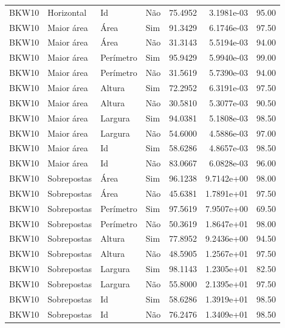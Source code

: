 \begin{tabular}{llllrrr}
BKW10     & Horizontal  & Id        & Não         & 75.4952      & 3.1981e-03 & 95.00    \\
BKW10     & Maior área  & Área      & Sim         & 91.3429      & 6.1746e-03 & 97.50    \\
BKW10     & Maior área  & Área      & Não         & 31.3143      & 5.5194e-03 & 94.00    \\
BKW10     & Maior área  & Perímetro & Sim         & 95.9429      & 5.9940e-03 & 99.00    \\
BKW10     & Maior área  & Perímetro & Não         & 31.5619      & 5.7390e-03 & 94.00    \\
BKW10     & Maior área  & Altura    & Sim         & 72.2952      & 6.3191e-03 & 97.50    \\
BKW10     & Maior área  & Altura    & Não         & 30.5810      & 5.3077e-03 & 90.50    \\
BKW10     & Maior área  & Largura   & Sim         & 94.0381      & 5.1808e-03 & 98.50    \\
BKW10     & Maior área  & Largura   & Não         & 54.6000      & 4.5886e-03 & 97.00    \\
BKW10     & Maior área  & Id        & Sim         & 58.6286      & 4.8657e-03 & 98.50    \\
BKW10     & Maior área  & Id        & Não         & 83.0667      & 6.0828e-03 & 96.00    \\
BKW10     & Sobrepostas & Área      & Sim         & 96.1238      & 9.7142e+00 & 98.00    \\
BKW10     & Sobrepostas & Área      & Não         & 45.6381      & 1.7891e+01 & 97.50    \\
BKW10     & Sobrepostas & Perímetro & Sim         & 97.5619      & 7.9507e+00 & 69.50    \\
BKW10     & Sobrepostas & Perímetro & Não         & 50.3619      & 1.8647e+01 & 98.00    \\
BKW10     & Sobrepostas & Altura    & Sim         & 77.8952      & 9.2436e+00 & 94.50    \\
BKW10     & Sobrepostas & Altura    & Não         & 48.5905      & 1.2567e+01 & 97.50    \\
BKW10     & Sobrepostas & Largura   & Sim         & 98.1143      & 1.2305e+01 & 82.50    \\
BKW10     & Sobrepostas & Largura   & Não         & 55.8000      & 2.1395e+01 & 97.50    \\
BKW10     & Sobrepostas & Id        & Sim         & 58.6286      & 1.3919e+01 & 98.50    \\
BKW10     & Sobrepostas & Id        & Não         & 76.2476      & 1.3409e+01 & 98.50    \\
\hline
\end{tabular}